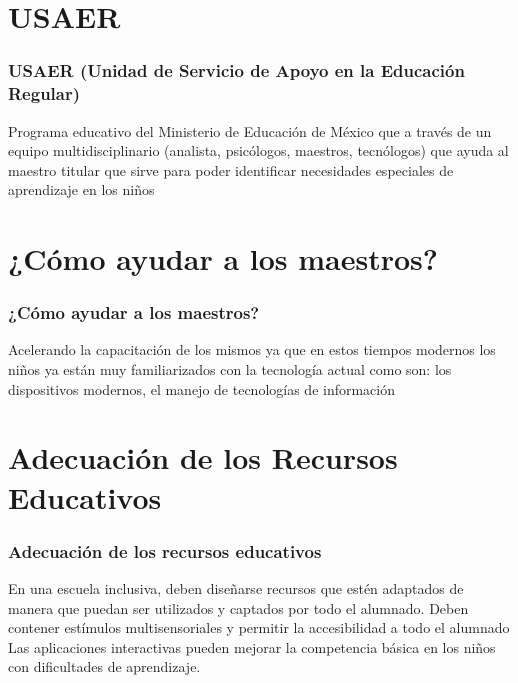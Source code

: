 \documentclass[11pt]{beamer}
\begin{document}
\section{USAER}
\begin{frame}
\frametitle{USAER (Unidad de Servicio de Apoyo en la Educación Regular)}
Programa educativo del Ministerio de Educación de México que a través de un equipo multidisciplinario (analista, psicólogos, maestros, tecnólogos) que ayuda al maestro titular que sirve para poder identificar necesidades especiales de aprendizaje en los niños
\end{frame}

\section{¿Cómo ayudar a los maestros?}
\begin{frame}
\frametitle{¿Cómo ayudar a los maestros?}
Acelerando la capacitación de los mismos ya que en estos tiempos modernos los niños ya están muy familiarizados con la tecnología actual como son: los dispositivos modernos, el manejo de tecnologías de información
\end{frame}

\section{Adecuación de los Recursos Educativos}
\begin{frame}
\frametitle{Adecuación de los recursos educativos}
En una escuela inclusiva, deben diseñarse recursos que estén adaptados de manera que puedan ser utilizados y captados por todo el alumnado.
Deben contener estímulos multisensoriales y permitir la accesibilidad a todo el alumnado
Las aplicaciones interactivas pueden mejorar la competencia básica en los niños con dificultades de aprendizaje.

\end{frame}
\end{document}
